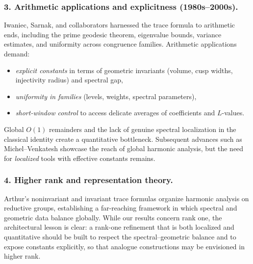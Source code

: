 \subsubsection*{3. Arithmetic applications and explicitness (1980s–2000s).}
Iwaniec, Sarnak, and collaborators \cite{Iwaniec2002,LuoSarnak1995} harnessed the trace formula to arithmetic ends,
including the prime geodesic theorem, eigenvalue bounds, variance estimates, and uniformity across congruence families.
Arithmetic applications demand:
\begin{itemize}
  \item \emph{explicit constants} in terms of geometric invariants (volume, cusp widths, injectivity radius) and spectral gap,
  \item \emph{uniformity in families} (levels, weights, spectral parameters),
  \item \emph{short-window control} to access delicate averages of coefficients and $L$-values.
\end{itemize}
Global $O(1)$ remainders and the lack of genuine spectral localization in the classical identity create a quantitative bottleneck.
Subsequent advances such as Michel–Venkatesh \cite{MichelVenkatesh2010} showcase the reach of global harmonic analysis, but the need
for \emph{localized} tools with effective constants remains.

\subsubsection*{4. Higher rank and representation theory.}
Arthur’s noninvariant and invariant trace formulas \cite{ArthurBook} organize harmonic analysis on reductive groups,
establishing a far-reaching framework in which spectral and geometric data balance globally. While our results concern
rank one, the architectural lesson is clear: a rank-one refinement that is both localized and quantitative should be built
to respect the spectral–geometric balance and to expose constants explicitly, so that analogue constructions may be envisioned
in higher rank.

